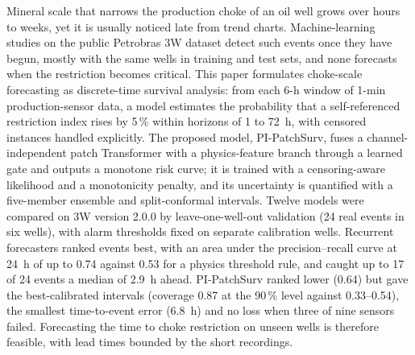 Mineral scale that narrows the production choke of an oil well grows over hours to weeks, yet it is
usually noticed late from trend charts. Machine-learning studies on the public Petrobras 3W dataset detect
such events once they have begun, mostly with the same wells in training and test sets, and none forecasts
when the restriction becomes critical. This paper formulates choke-scale forecasting as discrete-time
survival analysis: from each 6-h window of 1-min production-sensor data, a model estimates the probability
that a self-referenced restriction index rises by 5\,\% within horizons of 1 to 72~h, with censored
instances handled explicitly. The proposed model, PI-PatchSurv, fuses a channel-independent patch
Transformer with a physics-feature branch through a learned gate and outputs a monotone risk curve; it is
trained with a censoring-aware likelihood and a monotonicity penalty, and its uncertainty is quantified with
a five-member ensemble and split-conformal intervals. Twelve models were compared on 3W version 2.0.0 by
leave-one-well-out validation (24 real events in six wells), with alarm thresholds fixed on separate
calibration wells. Recurrent forecasters ranked events best, with an area under the precision--recall
curve at 24~h of up to 0.74 against 0.53 for a physics threshold rule, and caught up to 17 of 24 events a
median of 2.9~h ahead. PI-PatchSurv ranked lower (0.64) but gave the best-calibrated intervals (coverage
0.87 at the 90\,\% level against 0.33--0.54), the smallest time-to-event error (6.8~h) and no loss when
three of nine sensors failed. Forecasting the time to choke restriction on unseen wells is therefore
feasible, with lead times bounded by the short recordings.
